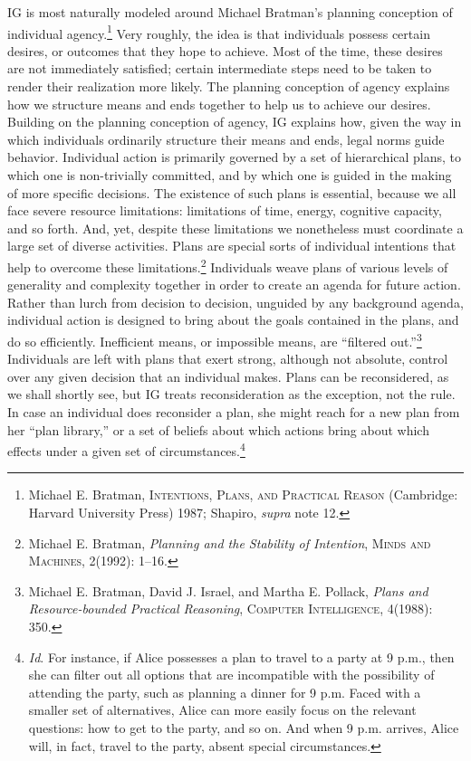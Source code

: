 IG is most naturally modeled around Michael Bratman's planning
conception of individual agency.\footnote{Michael E. Bratman,
  \textsc{Intentions, Plans, and Practical Reason} (Cambridge: Harvard
  University Press) 1987; Shapiro, \emph{supra} note 12.} Very roughly,
the idea is that individuals possess certain desires, or outcomes that
they hope to achieve. Most of the time, these desires are not
immediately satisfied; certain intermediate steps need to be taken to
render their realization more likely. The planning conception of agency
explains how we structure means and ends together to help us to achieve
our desires. Building on the planning conception of agency, IG explains
how, given the way in which individuals ordinarily structure their means
and ends, legal norms guide behavior. Individual action is primarily
governed by a set of hierarchical plans, to which one is non-trivially
committed, and by which one is guided in the making of more specific
decisions. The existence of such plans is essential, because we all face
severe resource limitations: limitations of time, energy, cognitive
capacity, and so forth. And, yet, despite these limitations we
nonetheless must coordinate a large set of diverse activities. Plans are
special sorts of individual intentions that help to overcome these
limitations.\footnote{Michael E. Bratman, \emph{Planning and the
  Stability of Intention}, \textsc{Minds and Machines}, 2(1992): 1--16.}
Individuals weave plans of various levels of generality and complexity
together in order to create an agenda for future action. Rather than
lurch from decision to decision, unguided by any background agenda,
individual action is designed to bring about the goals contained in the
plans, and do so efficiently. Inefficient means, or impossible means,
are ``filtered out.''\footnote{Michael E. Bratman, David J. Israel, and
  Martha E. Pollack, \emph{Plans and Resource-bounded Practical
  Reasoning}, \textsc{Computer Intelligence}, 4(1988): 350.} Individuals
are left with plans that exert strong, although not absolute, control
over any given decision that an individual makes. Plans can be
reconsidered, as we shall shortly see, but IG treats reconsideration as
the exception, not the rule. In case an individual does reconsider a
plan, she might reach for a new plan from her ``plan library,'' or a set
of beliefs about which actions bring about which effects under a given
set of circumstances.\footnote{\emph{Id}. For instance, if Alice
  possesses a plan to travel to a party at 9 p.m., then she can filter
  out all options that are incompatible with the possibility of
  attending the party, such as planning a dinner for 9 p.m. Faced with a
  smaller set of alternatives, Alice can more easily focus on the
  relevant questions: how to get to the party, and so on. And when 9
  p.m. arrives, Alice will, in fact, travel to the party, absent special
  circumstances.}

